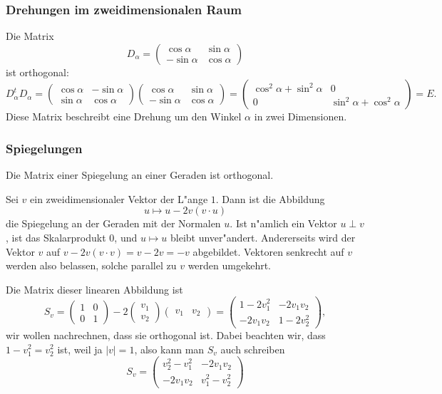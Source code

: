 \subsubsection{Drehungen im zweidimensionalen Raum}
Die Matrix
\[
D_\alpha
=
\begin{pmatrix}
\cos\alpha&\sin\alpha\\
-\sin\alpha&\cos\alpha
\end{pmatrix}
\]
ist orthogonal:
\[
D_\alpha^tD_\alpha
=
\begin{pmatrix}
\cos\alpha&-\sin\alpha\\
\sin\alpha&\cos\alpha
\end{pmatrix}
\begin{pmatrix}
\cos\alpha&\sin\alpha\\
-\sin\alpha&\cos\alpha
\end{pmatrix}
=
\begin{pmatrix}
\cos^2\alpha+\sin^2\alpha&0\\
0&\sin^2\alpha+\cos^2\alpha
\end{pmatrix}
=E.
\]
Diese Matrix beschreibt eine Drehung um den Winkel $\alpha$
in zwei Dimensionen.

\subsubsection{Spiegelungen}
Die Matrix einer Spiegelung an einer Geraden ist orthogonal.

\smallskip

{\parindent 0pt
Sei} $v$ ein zweidimensionaler Vektor der L"ange $1$.
Dann ist die Abbildung 
\[
u\mapsto u-2v(v\cdot u)
\]
die Spiegelung an der Geraden mit der Normalen $u$.
Ist n"amlich
ein Vektor $u\perp v$, ist das Skalarprodukt $0$, und $u\mapsto u$
bleibt unver"andert.
Andererseits wird der Vektor $v$ auf
$v-2v(v\cdot v)=v-2v=-v$ abgebildet.
Vektoren senkrecht auf $v$
werden also belassen, solche parallel zu $v$ werden umgekehrt.

Die Matrix dieser linearen Abbildung ist
\[
S_v=\begin{pmatrix}1&0\\0&1\end{pmatrix}
-
2\begin{pmatrix}v_1\\v_2\end{pmatrix}
\begin{pmatrix}v_1&v_2\end{pmatrix}
=
\begin{pmatrix}
1-2v_1^2&-2v_1v_2\\
-2v_1v_2&1-2v_2^2
\end{pmatrix},
\]
wir wollen nachrechnen, dass sie orthogonal ist.
Dabei beachten
wir, dass $1-v_1^2=v_2^2$ ist, weil ja $|v|=1$, also kann man $S_v$
auch schreiben
\[
S_v=\begin{pmatrix}
v_2^2-v_1^2&-2v_1v_2\\
-2v_1v_2&v_1^2-v_2^2
\end{pmatrix}
\]

